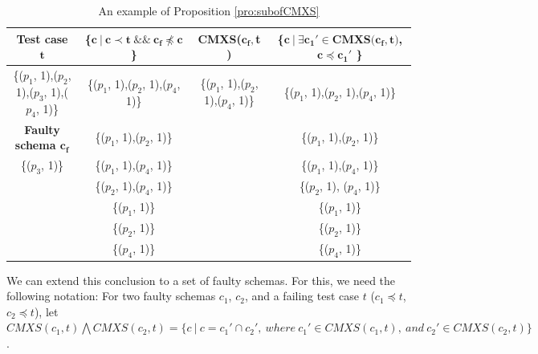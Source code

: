 \begin{table}[ht]
  \centering
  \setlength{\tabcolsep}{3pt}
  \caption{An example of Proposition \ref{pro:subofCMXS}}
    \begin{tabular}{|c|c|c|c|}
    \hline
  \textbf{  Test case $\textbf{t}$} & \textbf{ \{$\textbf{c}\ |\ \textbf{c} \prec \textbf{t}\ \&\&\ \textbf{c}_{\textbf{f}} \npreceq \textbf{c}$\} }& \textbf{ CMXS($\textbf{c}_{\textbf{f}}, $\textbf{t}$ $)} & \textbf{\{$ \textbf{c}\ |\ \exists \textbf{c}_{\textbf{1}}' \in \textbf{CMXS}\textbf{(}\textbf{c}_{\textbf{f}}, \textbf{t}\textbf{)}$, $\textbf{c} \preceq \textbf{c}_{\textbf{1}}'$ \}}\\\hline
    \{($p_{1}$, 1),($p_{2}$, 1),($p_{3}$, 1),($p_{4}$, 1)\}  & \{($p_{1}$, 1),($p_{2}$, 1),($p_{4}$, 1)\} & \{($p_{1}$, 1),($p_{2}$, 1),($p_{4}$, 1)\} & \{($p_{1}$, 1),($p_{2}$, 1),($p_{4}$, 1)\}\\ \cline{1-1}
      \textbf{Faulty schema $\textbf{c}_{\textbf{f}}$}  & \{($p_{1}$, 1),($p_{2}$, 1)\} &  & \{($p_{1}$, 1),($p_{2}$, 1)\} \\\cline{1-1}
     \{($p_{3}$, 1)\}         & \{($p_{1}$, 1),($p_{4}$, 1)\}&  &\{($p_{1}$, 1),($p_{4}$, 1)\}\\
          &       \{($p_{2}$, 1),($p_{4}$, 1)\} &  &\{($p_{2}$, 1), ($p_{4}$, 1)\}\\
          &       \{($p_{1}$, 1)\} &  &\{($p_{1}$, 1)\}\\
          &       \{($p_{2}$, 1)\} &  &\{($p_{2}$, 1)\}\\
          &       \{($p_{4}$, 1)\} &  & \{($p_{4}$, 1)\}\\\hline
    \end{tabular}%
  \label{examleOfCMXSPro}%
\end{table}%

%


We can extend this conclusion to a set of faulty schemas. For this, we need the following notation: For two faulty schemas $c_{1}$, $c_{2}$, and a failing test case $t$ ($c_{1} \preceq t$, $c_{2} \preceq t$), let $CMXS(c_{1}, t) \bigwedge CMXS(c_{2}, t)  = \{ c\ |\ c = c_{1}' \cap c_{2}',\ where\ c_{1}' \in CMXS(c_{1}, t),\ and\ c_{2}' \in CMXS(c_{2}, t) \}$.

